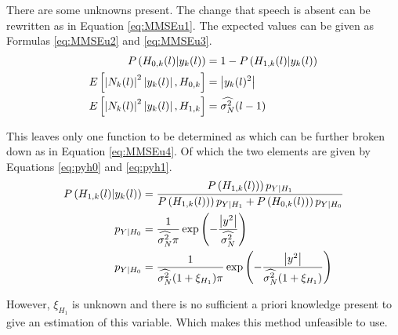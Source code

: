 There are some unknowns present. The change that speech is absent can be rewritten as in Equation \ref{eq:MMSEu1}. The expected values can be given as Formulas \ref{eq:MMSEu2} and \ref{eq:MMSEu3}.
\begin{align}
  P\left(H_{0,k}(l)|y_{k}(l)\right) &= 1 - P\left(H_{1,k}(l)|y_{k}(l)\right)
  \label{eq:MMSEu1} \\
  E\left[\abs{N_{k}(l)}^{2}\abs{y_{k}(l)},H_{0,k}\right] &= \abs{y_{k}(l)^{2}}
  \label{eq:MMSEu2} \\
  E\left[\abs{N_{k}(l)}^{2}\abs{y_{k}(l)},H_{1,k}\right] &= \widehat{\sigma_{N}^{2}}(l-1)
  \label{eq:MMSEu3}
\end{align}

This leaves only one function to be determined as which can be further broken down as in Equation \ref{eq:MMSEu4}. Of which the two elements are given by Equations \ref{eq:pyh0} and \ref{eq:pyh1}.
\begin{align}
  P\left(H_{1,k}(l)|y_{k}(l)\right) &= \frac{P\left(H_{1,k}(l))\right)p_{Y|H_{1}}}{P\left(H_{1,k}(l))\right)p_{Y|H_{1}} + P\left(H_{0,k}(l))\right)p_{Y|H_{0}}}
  \label{eq:MMSEu4}\\
  p_{Y|H_{0}} &= \frac{1}{\widehat{\sigma_{N}^{2}} \pi} \exp\left(-\frac{\abs{y^{2}}}{\widehat{\sigma_{N}^{2}}}\right)
  \label{eq:pyh0}\\
  p_{Y|H_{0}} &= \frac{1}{\widehat{\sigma_{N}^{2}} (1+\xi_{H_{1}})\pi} \exp\left(-\frac{\abs{y^{2}}}{\widehat{\sigma_{N}^{2}}(1+\xi_{H_{1}})}\right)
  \label{eq:pyh1}
\end{align}

However, $\xi_{H_{1}}$ is unknown and there is no sufficient a priori knowledge present to give an estimation of this variable. Which makes this method unfeasible to use.
